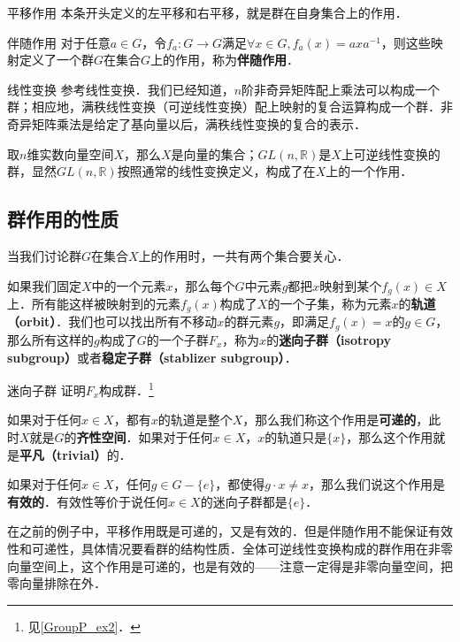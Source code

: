 \begin{example}{平移作用}\label{Group3_ex1}
本条开头定义的左平移和右平移，就是群在自身集合上的作用．
\end{example}

\begin{example}{伴随作用}\label{Group3_ex2}
对于任意$a\in G$，令$f_a: G\rightarrow G$满足$\forall x\in G, f_a(x)=axa^{-1}$，则这些映射定义了一个群$G$在集合$G$上的作用，称为\textbf{伴随作用}．
\end{example}

\begin{example}{线性变换}\label{Group3_ex3}
参考线性变换．我们已经知道，$n$阶非奇异矩阵配上乘法可以构成一个群；相应地，满秩线性变换（可逆线性变换）配上映射的复合运算构成一个群．非奇异矩阵乘法是给定了基向量以后，满秩线性变换的复合的表示．

取$n$维实数向量空间$X$，那么$X$是向量的集合；$GL(n,\mathbb{R})$是$X$上可逆线性变换的群，显然$GL(n,\mathbb{R})$按照通常的线性变换定义，构成了在$X$上的一个作用．
\end{example}

\subsection{群作用的性质}

当我们讨论群$G$在集合$X$上的作用时，一共有两个集合要关心．

如果我们固定$X$中的一个元素$x$，那么每个$G$中元素$g$都把$x$映射到某个$f_g(x)\in X$上．所有能这样被映射到的元素$f_g(x)$构成了$X$的一个子集，称为元素$x$的\textbf{轨道（orbit）}．我们也可以找出所有不移动$x$的群元素$g$，即满足$f_g(x)=x$的$g\in G$，那么所有这样的$g$构成了$G$的一个子群$F_x$，称为$x$的\textbf{迷向子群（isotropy subgroup）}或者\textbf{稳定子群（stablizer subgroup）}．

\begin{exercise}{迷向子群}\label{Group3_exe1}
证明$F_x$构成群．\footnote{见\autoref{GroupP_ex2}．}
\end{exercise}

如果对于任何$x\in X$，都有$x$的轨道是整个$X$，那么我们称这个作用是\textbf{可递的}，此时$X$就是$G$的\textbf{齐性空间}．如果对于任何$x\in X$，$x$的轨道只是$\{x\}$，那么这个作用就是\textbf{平凡（trivial）}的．

如果对于任何$x\in X$，任何$g\in G-\{e\}$，都使得$g\cdot x\not=x$，那么我们说这个作用是\textbf{有效的}．有效性等价于说任何$x\in X$的迷向子群都是$\{e\}$．

在之前的例子中，平移作用既是可递的，又是有效的．但是伴随作用不能保证有效性和可递性，具体情况要看群的结构性质．全体可逆线性变换构成的群作用在非零向量空间上，这个作用是可递的，也是有效的——注意一定得是非零向量空间，把零向量排除在外．


